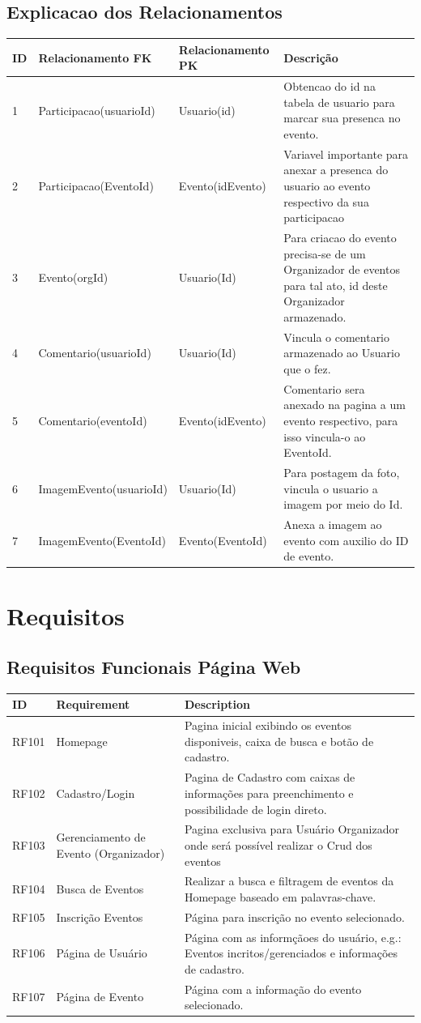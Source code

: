 \section{Explicacao dos Relacionamentos}
\begin{tabular}{>{\raggedright}p{1.5cm}>{\raggedright}p{4cm}>{\raggedright}p{4cm}>{\raggedright}p{6cm}}
\toprule
  \textbf{ID} & \textbf{Relacionamento FK} &\textbf{Relacionamento PK} & \textbf{Descrição}  \tabularnewline 
\midrule
  1 & Participacao(usuarioId) & Usuario(id) & Obtencao do id na tabela de usuario para marcar sua presenca no evento. 
  \tabularnewline \hline
  2 & Participacao(EventoId) & Evento(idEvento) & Variavel importante para anexar a presenca do usuario ao evento respectivo da sua participacao
  \tabularnewline \hline
  3 & Evento(orgId) & Usuario(Id) & Para criacao do evento precisa-se de um Organizador de eventos para tal ato, id deste Organizador armazenado. \tabularnewline \hline
  4 & Comentario(usuarioId)& Usuario(Id) & Vincula o comentario armazenado ao Usuario que o fez. 
  \tabularnewline \hline
  5 & Comentario(eventoId) & Evento(idEvento) & Comentario sera anexado na pagina a um evento respectivo, para isso vincula-o ao EventoId. \tabularnewline \hline
  6 & ImagemEvento(usuarioId) & Usuario(Id) & Para postagem da foto, vincula o usuario a imagem por meio do Id. 
  \tabularnewline \hline
  7 & ImagemEvento(EventoId) & Evento(EventoId) & Anexa a imagem ao evento com auxilio do ID de evento.
  \tabularnewline 
\bottomrule
\end{tabular}

\chapter{Requisitos}
\label{Requisitos}

\section{Requisitos Funcionais Página Web}

\begin{tabular}{>{\raggedright}p{1.5cm}>{\raggedright}p{4cm}>{\raggedright}p{10cm}}
\toprule
\textbf{ID} & \textbf{Requirement} & \textbf{Description} \tabularnewline 
\midrule
  RF101 & Homepage & Pagina inicial exibindo os eventos disponiveis, caixa de busca e botão de cadastro.\tabularnewline \hline
  RF102 & Cadastro/Login & Pagina de Cadastro com caixas de informações para preenchimento e possibilidade de login direto.\tabularnewline \hline
  RF103 & Gerenciamento de Evento (Organizador) & Pagina exclusiva para Usuário Organizador onde será possível realizar o Crud dos eventos\tabularnewline \hline 
  RF104 & Busca de Eventos & Realizar a busca e filtragem de eventos da Homepage baseado em palavras-chave.\tabularnewline \hline
  RF105 & Inscrição Eventos & Página para inscrição no evento selecionado.\tabularnewline \hline
  RF106 & Página de Usuário & Página com as informçãoes do usuário, e.g.: Eventos incritos/gerenciados e informações de cadastro.\tabularnewline \hline
  RF107 & Página de Evento & Página com a informação do evento selecionado.\tabularnewline
\bottomrule
\end{tabular}

